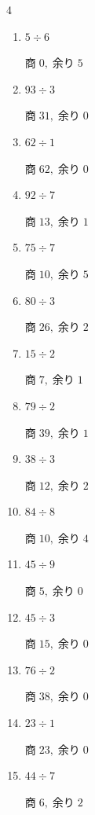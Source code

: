 \begin{multicols}{4}
\begin{enumerate}
\columnbreak %

  \item $5 \div 6$

        $商\; 0,\; 余り\; 5$

  \item $93 \div 3$

        $商\; 31,\; 余り\; 0$

  \item $62 \div 1$

        $商\; 62,\; 余り\; 0$

  \item $92 \div 7$

        $商\; 13,\; 余り\; 1$

  \item $75 \div 7$

        $商\; 10,\; 余り\; 5$

  \item $80 \div 3$

        $商\; 26,\; 余り\; 2$

  \item $15 \div 2$

        $商\; 7,\; 余り\; 1$

  \item $79 \div 2$

        $商\; 39,\; 余り\; 1$

  \item $38 \div 3$

        $商\; 12,\; 余り\; 2$

  \item $84 \div 8$

        $商\; 10,\; 余り\; 4$

  \item $45 \div 9$

        $商\; 5,\; 余り\; 0$

  \item $45 \div 3$

        $商\; 15,\; 余り\; 0$

  \item $76 \div 2$

        $商\; 38,\; 余り\; 0$

  \item $23 \div 1$

        $商\; 23,\; 余り\; 0$

  \item $44 \div 7$

        $商\; 6,\; 余り\; 2$


\end{enumerate}
\end{multicols}
